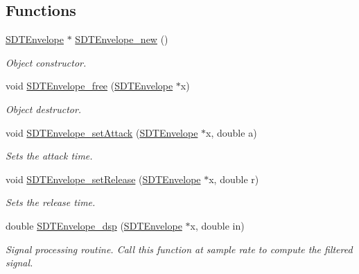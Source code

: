 \subsection*{Functions}
\begin{DoxyCompactItemize}
\item 
\hyperlink{group__envelope_gafbf35d3d3dc5e65f15a864c79934206d}{S\+D\+T\+Envelope} $\ast$ \hyperlink{group__envelope_ga7560e74069e92e5801ef05f62029db28}{S\+D\+T\+Envelope\+\_\+new} ()
\begin{DoxyCompactList}\small\item\em Object constructor. \end{DoxyCompactList}\item 
void \hyperlink{group__envelope_ga52fa046a8fa04e2aebd2694b8a4dda27}{S\+D\+T\+Envelope\+\_\+free} (\hyperlink{group__envelope_gafbf35d3d3dc5e65f15a864c79934206d}{S\+D\+T\+Envelope} $\ast$x)
\begin{DoxyCompactList}\small\item\em Object destructor. \end{DoxyCompactList}\item 
void \hyperlink{group__envelope_gaf5b219fc0777375765a6aecca809252b}{S\+D\+T\+Envelope\+\_\+set\+Attack} (\hyperlink{group__envelope_gafbf35d3d3dc5e65f15a864c79934206d}{S\+D\+T\+Envelope} $\ast$x, double a)
\begin{DoxyCompactList}\small\item\em Sets the attack time. \end{DoxyCompactList}\item 
void \hyperlink{group__envelope_ga3486e9286a82a3f38b326a96376e6c5d}{S\+D\+T\+Envelope\+\_\+set\+Release} (\hyperlink{group__envelope_gafbf35d3d3dc5e65f15a864c79934206d}{S\+D\+T\+Envelope} $\ast$x, double r)
\begin{DoxyCompactList}\small\item\em Sets the release time. \end{DoxyCompactList}\item 
double \hyperlink{group__envelope_gacdb45bbde2c62d73cc7325d915742063}{S\+D\+T\+Envelope\+\_\+dsp} (\hyperlink{group__envelope_gafbf35d3d3dc5e65f15a864c79934206d}{S\+D\+T\+Envelope} $\ast$x, double in)
\begin{DoxyCompactList}\small\item\em Signal processing routine. Call this function at sample rate to compute the filtered signal. \end{DoxyCompactList}\end{DoxyCompactItemize}


